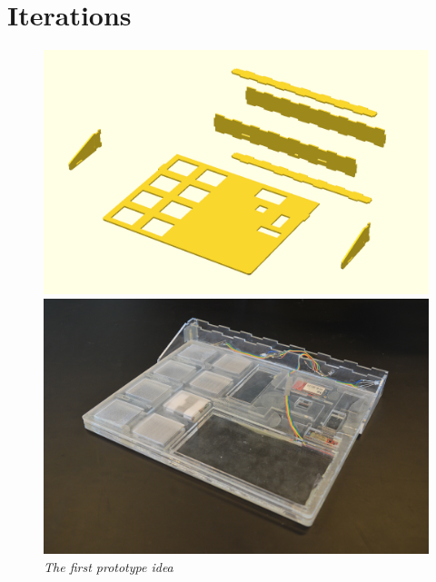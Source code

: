 \section{Iterations}



\begin{figure}[h]
\begin{minipage}[b]{7.5cm}
\centering
\includegraphics[scale=0.235]{figures/iterations/v1.png}
\end{minipage}
\begin{minipage}[b]{7.5cm}
\centering
\includegraphics[scale=0.58]{figures/iterations/v1-photo.jpg}
\end{minipage}
\caption{\small {\it {The first prototype idea}}} \label{fig:v1}
\end{figure}

